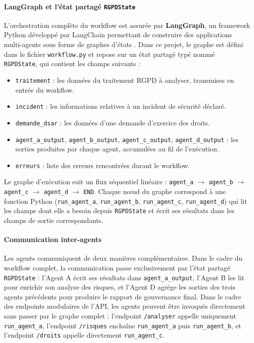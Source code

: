 \documentclass[12pt,a4paper]{report}
\begin{document}
\paragraph{LangGraph et l'état partagé \texttt{RGPDState}}

L'orchestration complète du workflow est assurée par \textbf{LangGraph}, un framework Python développé par LangChain permettant de construire des applications multi-agents sous forme de graphes d'états \cite{chase_langgraph}. Dans ce projet, le graphe est défini dans le fichier \texttt{workflow.py} et repose sur un état partagé typé nommé \texttt{RGPDState}, qui contient les champs suivants :

\begin{itemize}[leftmargin=*, label=\textbullet]
    \item \texttt{traitement} : les données du traitement RGPD à analyser, transmises en entrée du workflow.
    \item \texttt{incident} : les informations relatives à un incident de sécurité déclaré.
    \item \texttt{demande\_dsar} : les données d'une demande d'exercice des droits.
    \item \texttt{agent\_a\_output}, \texttt{agent\_b\_output}, \texttt{agent\_c\_output}, \texttt{agent\_d\_output} : les sorties produites par chaque agent, accumulées au fil de l'exécution.
    \item \texttt{erreurs} : liste des erreurs rencontrées durant le workflow.
\end{itemize}

Le graphe d'exécution suit un flux séquentiel linéaire : \texttt{agent\_a} $\rightarrow$ \texttt{agent\_b} $\rightarrow$ \texttt{agent\_c} $\rightarrow$ \texttt{agent\_d} $\rightarrow$ \texttt{END}. Chaque nœud du graphe correspond à une fonction Python (\texttt{run\_agent\_a}, \texttt{run\_agent\_b}, \texttt{run\_agent\_c}, \texttt{run\_agent\_d}) qui lit les champs dont elle a besoin depuis \texttt{RGPDState} et écrit ses résultats dans les champs de sortie correspondants.

\paragraph{Communication inter-agents}

Les agents communiquent de deux manières complémentaires. Dans le cadre du workflow complet, la communication passe exclusivement par l'état partagé \texttt{RGPDState} : l'Agent A écrit ses résultats dans \texttt{agent\_a\_output}, l'Agent B les lit pour enrichir son analyse des risques, et l'Agent D agrège les sorties des trois agents précédents pour produire le rapport de gouvernance final. Dans le cadre des endpoints modulaires de l'API, les agents peuvent être invoqués directement sans passer par le graphe complet : l'endpoint \texttt{/analyser} appelle uniquement \texttt{run\_agent\_a}, l'endpoint \texttt{/risques} enchaîne \texttt{run\_agent\_a} puis \texttt{run\_agent\_b}, et l'endpoint \texttt{/droits} appelle directement \texttt{run\_agent\_c}.
\end{document}
